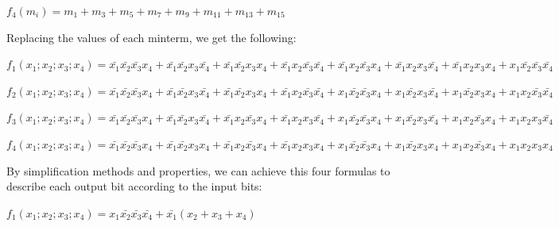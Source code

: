 \begin{center}
$f_{4}(m_{i})=m_{1}+m_{3}+m_{5}+m_{7}+m_{9}+m_{11}+m_{13}+m_{15}$
\par\end{center}

Replacing the values of each minterm, we get the following:
\begin{center}
$f_{1}(x_{1};x_{2};x_{3};x_{4})=\bar{x_{1}}\bar{x_{2}}\bar{x_{3}}x_{4}+\bar{x_{1}}\bar{x_{2}}x_{3}\bar{x_{4}}+\bar{x_{1}}\bar{x_{2}}x_{3}x_{4}+\bar{x_{1}}x_{2}\bar{x_{3}}\bar{x_{4}}+\bar{x_{1}}x_{2}\bar{x_{3}}x_{4}+\bar{x_{1}}x_{2}x_{3}\bar{x_{4}}+\bar{x_{1}}x_{2}x_{3}x_{4}+x_{1}\bar{x_{2}}\bar{x_{3}}\bar{x_{4}}$
\par\end{center}

\begin{center}
$f_{2}(x_{1};x_{2};x_{3};x_{4})=\bar{x_{1}}\bar{x_{2}}\bar{x_{3}}x_{4}+\bar{x_{1}}\bar{x_{2}}x_{3}\bar{x_{4}}+\bar{x_{1}}\bar{x_{2}}x_{3}x_{4}+\bar{x_{1}}x_{2}\bar{x_{3}}\bar{x_{4}}+x_{1}\bar{x_{2}}\bar{x_{3}}x_{4}+x_{1}\bar{x_{2}}x_{3}\bar{x_{4}}+x_{1}\bar{x_{2}}x_{3}x_{4}+x_{1}x_{2}\bar{x_{3}}\bar{x_{4}}$
\par\end{center}

\begin{center}
$f_{3}(x_{1};x_{2};x_{3};x_{4})=\bar{x_{1}}\bar{x_{2}}\bar{x_{3}}x_{4}+\bar{x_{1}}\bar{x_{2}}x_{3}\bar{x_{4}}+\bar{x_{1}}x_{2}\bar{x_{3}}x_{4}+\bar{x_{1}}x_{2}x_{3}\bar{x_{4}}+x_{1}\bar{x_{2}}\bar{x_{3}}x_{4}+x_{1}\bar{x_{2}}x_{3}\bar{x_{4}}+x_{1}x_{2}\bar{x_{3}}x_{4}+x_{1}x_{2}x_{3}\bar{x_{4}}$
\par\end{center}

\begin{center}
$f_{4}(x_{1};x_{2};x_{3};x_{4})=\bar{x_{1}}\bar{x_{2}}\bar{x_{3}}x_{4}+\bar{x_{1}}\bar{x_{2}}x_{3}x_{4}+\bar{x_{1}}x_{2}\bar{x_{3}}x_{4}+\bar{x_{1}}x_{2}x_{3}x_{4}+x_{1}\bar{x_{2}}\bar{x_{3}}x_{4}+x_{1}\bar{x_{2}}x_{3}x_{4}+x_{1}x_{2}\bar{x_{3}}x_{4}+x_{1}x_{2}x_{3}x_{4}$
\par\end{center}

By simplification methods and properties, we can achieve this
four formulas to describe each output bit according to the input bits:
\begin{center}
$f_{1}(x_{1};x_{2};x_{3};x_{4})=x_{1}\bar{x_{2}}\bar{x_{3}}\bar{x_{4}}+\bar{x_{1}}(x_{2}+x_{3}+x_{4})$
\par\end{center}

